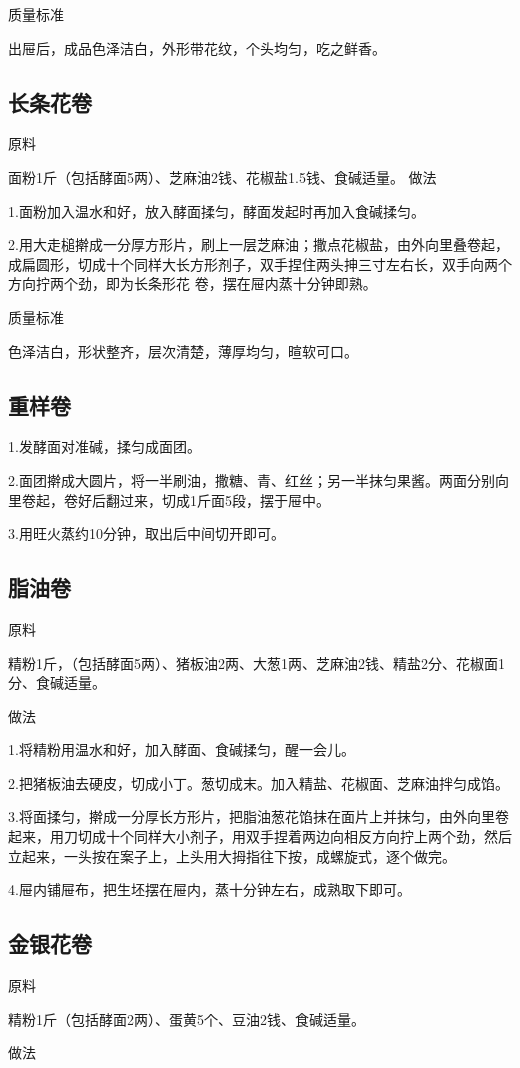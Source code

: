 \documentclass{ctexbook}
\begin{document}
质量标准

出屉后，成品色泽洁白，外形带花纹，个头均匀，吃之鲜香。
\subsection{长条花卷}
原料

面粉1斤（包括酵面5两）、芝麻油2钱、花椒盐1.5钱、食碱适量。
做法

1.面粉加入温水和好，放入酵面揉匀，酵面发起时再加入食碱揉匀。

2.用大走槌擀成一分厚方形片，刷上一层芝麻油；撒点花椒盐，由外向里叠卷起，成扁圆形，切成十个同样大长方形剂子，双手捏住两头抻三寸左右长，双手向两个方向拧两个劲，即为长条形花 卷，摆在屉内蒸十分钟即熟。

质量标准

色泽洁白，形状整齐，层次清楚，薄厚均匀，暄软可口。
\subsection{重样卷}
1.发酵面对准碱，揉匀成面团。

2.面团擀成大圆片，将一半刷油，撒糖、青、红丝；另一半抹匀果酱。两面分别向里卷起，卷好后翻过来，切成1斤面5段，摆于屉中。

3.用旺火蒸约10分钟，取出后中间切开即可。
\subsection{脂油卷}
原料

精粉1斤，（包括酵面5两）、猪板油2两、大葱1两、芝麻油2钱、精盐2分、花椒面1分、食碱适量。

做法

1.将精粉用温水和好，加入酵面、食碱揉匀，醒一会儿。

2.把猪板油去硬皮，切成小丁。葱切成末。加入精盐、花椒面、芝麻油拌匀成馅。

3.将面揉匀，擀成一分厚长方形片，把脂油葱花馅抹在面片上并抹匀，由外向里卷起来，用刀切成十个同样大小剂子，用双手捏着两边向相反方向拧上两个劲，然后立起来，一头按在案子上，上头用大拇指往下按，成螺旋式，逐个做完。

4.屉内铺屉布，把生坯摆在屉内，蒸十分钟左右，成熟取下即可。
\subsection{金银花卷}
原料

精粉1斤（包括酵面2两）、蛋黄5个、豆油2钱、食碱适量。

做法
\end{document}
